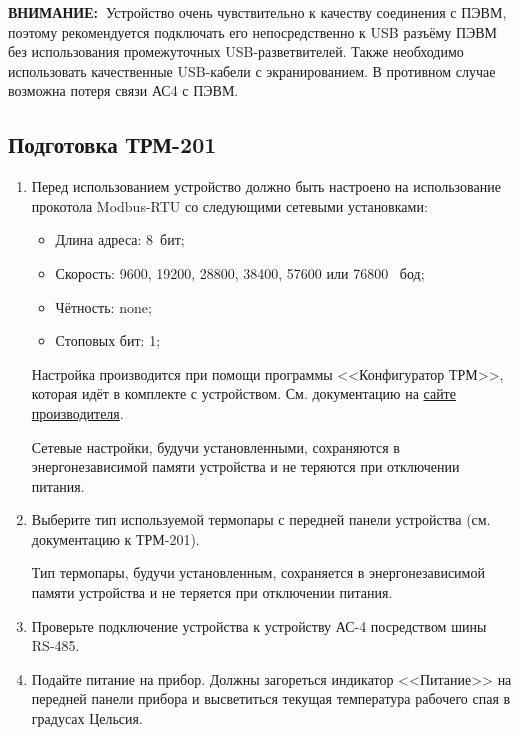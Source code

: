 \documentclass[12pt, a4paper, twocolumn]{report}
\newcommand{\IMPORTANT}{{\bf ВНИМАНИЕ:~}}
\begin{document}
\IMPORTANT Устройство очень чувствительно к качеству соединения с ПЭВМ, поэтому рекомендуется подключать его непосредственно к USB разъёму ПЭВМ без использования промежуточных USB-разветвителей. Также необходимо использовать качественные USB-кабели с экранированием. В противном случае возможна потеря связи АС4 с ПЭВМ.

\subsection{Подготовка ТРМ-201}

\begin{enumerate}

\item Перед использованием устройство должно быть настроено на использование прокотола Modbus-RTU со следующими сетевыми установками:

\begin{itemize}
\item Длина адреса: 8~бит;
\item Скорость: 9600, 19200, 28800, 38400, 57600 или 76800 ~бод;
\item Чётность: none;
\item Стоповых бит: 1;
\end{itemize}

Настройка производится при помощи программы <<Конфигуратор ТРМ>>, которая идёт в комплекте с устройством. См. документацию на \href{http://www.owen.ru/catalog/izmeritel_regulyator_odnokanal_nij_s_rs_485_oven_trm201/opisanie}{сайте производителя}.

Сетевые настройки, будучи установленными, сохраняются в энергонезависимой памяти устройства и не теряются при отключении питания.

\item Выберите тип используемой термопары с передней панели устройства (см. документацию к ТРМ-201).

Тип термопары, будучи установленным, сохраняется в энергонезависимой памяти устройства и не теряется при отключении питания.

\item Проверьте подключение устройства к устройству АС-4 посредством шины RS-485.

\item Подайте питание на прибор. Должны загореться индикатор <<Питание>> на передней панели прибора и высветиться текущая температура рабочего спая в градусах Цельсия.

\end{enumerate}
\end{document}
